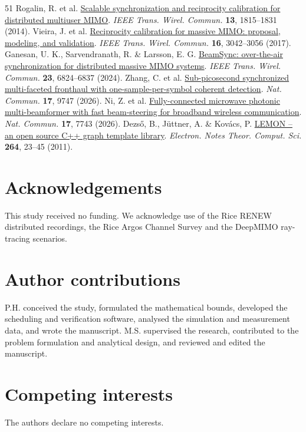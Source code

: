 \documentclass[lineno,pdflatex,sn-nature]{sn-jnl}
\begin{document}
\begin{thebibliography}{51}
 Rogalin, R. et al. \href{https://doi.org/10.1109/TWC.2014.030314.130474}{Scalable synchronization and reciprocity calibration for distributed multiuser MIMO}. \emph{IEEE Trans. Wirel. Commun.} \textbf{13}, 1815–1831 (2014).
 Vieira, J. et al. \href{https://doi.org/10.1109/TWC.2017.2674659}{Reciprocity calibration for massive MIMO: proposal, modeling, and validation}. \emph{IEEE Trans. Wirel. Commun.} \textbf{16}, 3042–3056 (2017).
 Ganesan, U. K., Sarvendranath, R. \& Larsson, E. G. \href{https://doi.org/10.1109/TWC.2023.3335089}{BeamSync: over-the-air synchronization for distributed massive MIMO systems}. \emph{IEEE Trans. Wirel. Commun.} \textbf{23}, 6824–6837 (2024).
 Zhang, C. et al. \href{https://doi.org/10.1038/s41467-026-76739-2}{Sub-picosecond synchronized multi-faceted fronthaul with one-sample-per-symbol coherent detection}. \emph{Nat. Commun.} \textbf{17}, 9747 (2026).
 Ni, Z. et al. \href{https://doi.org/10.1038/s41467-026-74485-z}{Fully-connected microwave photonic multi-beamformer with fast beam-steering for broadband wireless communication}. \emph{Nat. Commun.} \textbf{17}, 7743 (2026).
 Dezső, B., Jüttner, A. \& Kovács, P. \href{https://doi.org/10.1016/j.entcs.2011.06.003}{LEMON – an open source C++ graph template library}. \emph{Electron. Notes Theor. Comput. Sci.} \textbf{264}, 23–45 (2011).
\end{thebibliography}
\section*{Acknowledgements}
This study received no funding. We acknowledge use of the Rice RENEW distributed recordings, the Rice Argos Channel Survey and the DeepMIMO ray-tracing scenarios.
\section*{Author contributions}
P.H. conceived the study, formulated the mathematical bounds, developed the scheduling and verification software, analysed the simulation and measurement data, and wrote the manuscript. M.S. supervised the research, contributed to the problem formulation and analytical design, and reviewed and edited the manuscript.

\section*{Competing interests}
The authors declare no competing interests.
\end{document}
